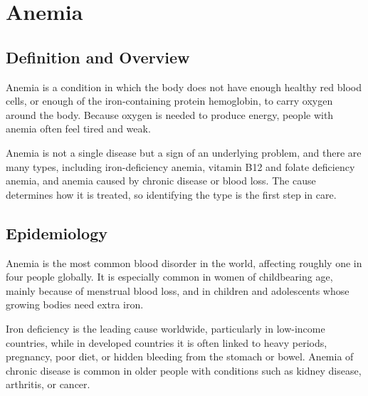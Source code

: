\chapter{Anemia}

\section*{Definition and Overview}
Anemia is a condition in which the body does not have enough healthy red blood cells, or enough of the iron-containing protein hemoglobin, to carry oxygen around the body. Because oxygen is needed to produce energy, people with anemia often feel tired and weak.

Anemia is not a single disease but a sign of an underlying problem, and there are many types, including iron-deficiency anemia, vitamin B12 and folate deficiency anemia, and anemia caused by chronic disease or blood loss. The cause determines how it is treated, so identifying the type is the first step in care.

\section*{Epidemiology}
Anemia is the most common blood disorder in the world, affecting roughly one in four people globally. It is especially common in women of childbearing age, mainly because of menstrual blood loss, and in children and adolescents whose growing bodies need extra iron.

Iron deficiency is the leading cause worldwide, particularly in low-income countries, while in developed countries it is often linked to heavy periods, pregnancy, poor diet, or hidden bleeding from the stomach or bowel. Anemia of chronic disease is common in older people with conditions such as kidney disease, arthritis, or cancer.

